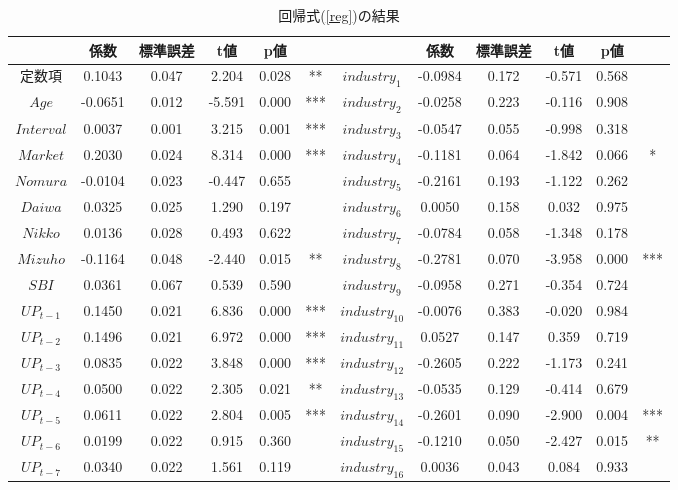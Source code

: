 \documentclass{jsarticle}
\begin{document}
\begin{table}[h]
  \begin{center}
  \caption{回帰式(\ref{reg})の結果}
  \label{tab:reg}
\begin{tabular}{|c|ccccc|c|ccccc|}
\hline
 & 係数 & 標準誤差 & t値 & p値 &  &  & 係数 & 標準誤差 & t値 & p値 &  \\
 \hline\hline
定数項 & 0.1043 & 0.047 & 2.204 & 0.028 & ** & $industry_{1}$ & -0.0984 & 0.172 & -0.571 & 0.568 &  \\
$Age$ & -0.0651 & 0.012 & -5.591 & 0.000 & *** & $industry_{2}$ & -0.0258 & 0.223 & -0.116 & 0.908 &    \\
$Interval$ & 0.0037 & 0.001 & 3.215 & 0.001 & *** & $industry_{3}$ & -0.0547 & 0.055 & -0.998 & 0.318 &    \\
$Market$ & 0.2030 & 0.024 & 8.314 & 0.000 & *** & $industry_{4}$ & -0.1181 & 0.064 & -1.842 & 0.066 & *   \\
$Nomura$ & -0.0104 & 0.023 & -0.447 & 0.655 &  & $industry_{5}$ & -0.2161 & 0.193 & -1.122 & 0.262 &   \\
$Daiwa$ & 0.0325 & 0.025 & 1.290 & 0.197 &  & $industry_{6}$ & 0.0050 & 0.158 & 0.032 & 0.975 &   \\
$Nikko$ & 0.0136 & 0.028 & 0.493 & 0.622 &  & $industry_{7}$ & -0.0784 & 0.058 & -1.348 & 0.178 &    \\
$Mizuho$ & -0.1164 & 0.048 & -2.440 & 0.015 & ** & $industry_{8}$ & -0.2781 & 0.070 & -3.958 & 0.000 & ***   \\
$SBI$ & 0.0361 & 0.067 & 0.539 & 0.590 &  & $industry_{9}$ & -0.0958 & 0.271 & -0.354 & 0.724 &    \\
$UP_{t-1}$ & 0.1450 & 0.021 & 6.836 & 0.000 & *** & $industry_{10}$ & -0.0076 & 0.383 & -0.020 & 0.984 &   \\
$UP_{t-2}$ & 0.1496 & 0.021 & 6.972 & 0.000 & *** & $industry_{11}$ & 0.0527 & 0.147 & 0.359 & 0.719 &    \\
$UP_{t-3}$ & 0.0835 & 0.022 & 3.848 & 0.000 & *** & $industry_{12}$ & -0.2605 & 0.222 & -1.173 & 0.241 &    \\
$UP_{t-4}$ & 0.0500 & 0.022 & 2.305 & 0.021 & ** & $industry_{13}$ & -0.0535 & 0.129 & -0.414 & 0.679 &    \\
$UP_{t-5}$ & 0.0611 & 0.022 & 2.804 & 0.005 & *** & $industry_{14}$ & -0.2601 & 0.090 & -2.900 & 0.004 & ***   \\
$UP_{t-6}$ & 0.0199 & 0.022 & 0.915 & 0.360 &  & $industry_{15}$ & -0.1210 & 0.050 & -2.427 & 0.015 & **   \\
$UP_{t-7}$ & 0.0340 & 0.022 & 1.561 & 0.119 &  & $industry_{16}$ & 0.0036 & 0.043 & 0.084 & 0.933 &    \\

\end{tabular}
\end{center}
\end{table}
\end{document}

